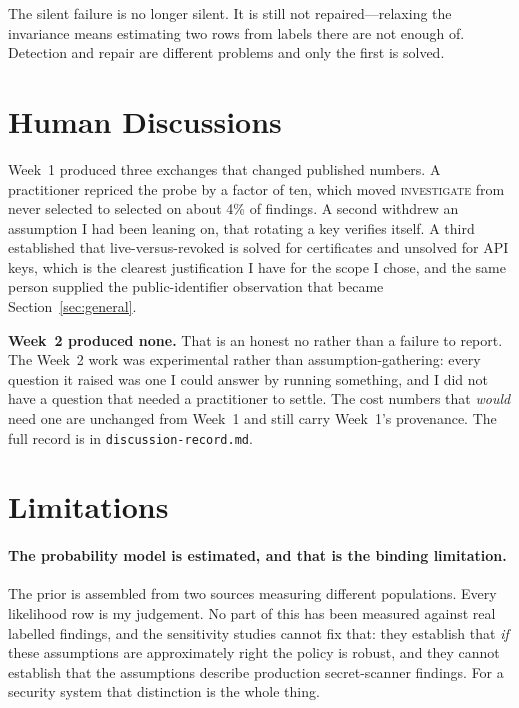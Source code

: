 \documentclass{article}
\begin{document}
The silent failure is no longer silent. It is still not repaired---relaxing the
invariance means estimating two rows from labels there are not enough of.
Detection and repair are different problems and only the first is solved.

\section{Human Discussions}
\label{sec:human}

Week~1 produced three exchanges that changed published numbers. A practitioner
repriced the probe by a factor of ten, which moved \textsc{investigate} from
never selected to selected on about 4\% of findings. A second withdrew an
assumption I had been leaning on, that rotating a key verifies itself. A third
established that live-versus-revoked is solved for certificates and unsolved for
API keys, which is the clearest justification I have for the scope I chose, and
the same person supplied the public-identifier observation that became
Section~\ref{sec:general}.

\textbf{Week~2 produced none.} That is an honest no rather than a failure to
report. The Week~2 work was experimental rather than assumption-gathering: every
question it raised was one I could answer by running something, and I did not
have a question that needed a practitioner to settle. The cost numbers that
\emph{would} need one are unchanged from Week~1 and still carry Week~1's
provenance. The full record is in \texttt{discussion-record.md}.

\section{Limitations}
\label{sec:limits}

\paragraph{The probability model is estimated, and that is the binding
limitation.} The prior is assembled from two sources measuring different
populations. Every likelihood row is my judgement. No part of this has been
measured against real labelled findings, and the sensitivity studies cannot fix
that: they establish that \emph{if} these assumptions are approximately right the
policy is robust, and they cannot establish that the assumptions describe
production secret-scanner findings. For a security system that distinction is the
whole thing.
\end{document}
